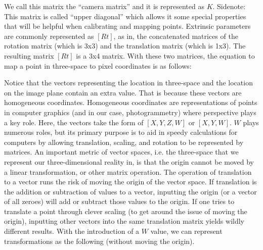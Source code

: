 \documentclass[12pt,twoside]{reedthesis}
\begin{document}
We call this matrix the “camera matrix” and it is represented as $K$. Sidenote: This matrix is called “upper diagonal” which allows it some special properties that will be helpful when calibrating and mapping points.
Extrinsic parameters are commonly represented as $[R t]$, as in, the concatenated matrices of the rotation matrix (which is 3x3) and the translation matrix (which is 1x3). The resulting matrix $[R t]$ is a 3x4 matrix. With these two matrices, the equation to map a point in three-space to pixel coordinates is as follows:

Notice that the vectors representing the location in three-space and the location on the image plane contain an extra value. That is because these vectors are homogeneous coordinates. Homogeneous coordinates are representations of points in computer graphics (and in our case, photogrammetry) where perspective plays a key role. Here, the vectors take the form of $[X,Y,Z,W]$ or $[X,Y,W]$. $W$ plays numerous roles, but its primary purpose is to aid in speedy calculations for computers by allowing translation, scaling, and rotation to be represented by matrices. An important metric of vector spaces, i.e. the three-space that we represent our three-dimensional reality in, is that the origin cannot be moved by a linear transformation, or other matrix operation. The operation of translation to a vector runs the risk of moving the origin of the vector space. If translation is the addition or subtraction of values to a vector, inputting the origin (or a vector of all zeroes) will add or subtract those values to the origin. If one tries to translate a point through clever scaling (to get around the issue of moving the origin), inputting other vectors into the same translation matrix yields wildly different results. With the introduction of a $W$ value, we can represent transformations as the following (without moving the origin).
\end{document}
